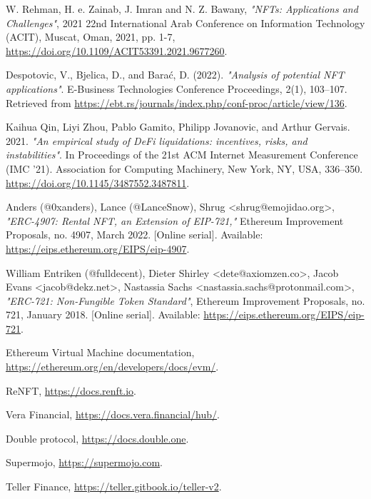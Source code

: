 \documentclass[english, LaM, oneside]{sapthesis}%
\begin{document}
\backmatter
{}
\begin{thebibliography}{17}

W. Rehman, H. e. Zainab, J. Imran and N. Z. Bawany, \textit{"NFTs: Applications and Challenges"}, 2021 22nd International Arab Conference on Information Technology (ACIT), Muscat, Oman, 2021, pp. 1-7, \url{https://doi.org/10.1109/ACIT53391.2021.9677260}.

Despotovic, V., Bjelica, D., and Barać, D. (2022). \textit{"Analysis of potential NFT applications"}. E-Business Technologies Conference Proceedings, 2(1), 103–107. Retrieved from \url{https://ebt.rs/journals/index.php/conf-proc/article/view/136}.

Kaihua Qin, Liyi Zhou, Pablo Gamito, Philipp Jovanovic, and Arthur Gervais. 2021. \textit{"An empirical study of DeFi liquidations: incentives, risks, and instabilities"}. In Proceedings of the 21st ACM Internet Measurement Conference (IMC '21). Association for Computing Machinery, New York, NY, USA, 336–350. \url{https://doi.org/10.1145/3487552.3487811}.

Anders (@0xanders), Lance (@LanceSnow), Shrug <shrug@emojidao.org>, \textit{"ERC-4907: Rental NFT, an Extension of EIP-721,"} Ethereum Improvement Proposals, no. 4907, March 2022. [Online serial]. Available: \url{https://eips.ethereum.org/EIPS/eip-4907}.

William Entriken (@fulldecent), Dieter Shirley <dete@axiomzen.co>, Jacob Evans <jacob@dekz.net>, Nastassia Sachs <nastassia.sachs@protonmail.com>, \textit{"ERC-721: Non-Fungible Token Standard"}, Ethereum Improvement Proposals, no. 721, January 2018. [Online serial]. Available: \url{https://eips.ethereum.org/EIPS/eip-721}.

Ethereum Virtual Machine documentation, \url{https://ethereum.org/en/developers/docs/evm/}.

ReNFT, \url{https://docs.renft.io}.

Vera Financial, \url{https://docs.vera.financial/hub/}.

Double protocol, \url{https://docs.double.one}.

Supermojo, \url{https://supermojo.com}.

Teller Finance, \url{https://teller.gitbook.io/teller-v2}.


\end{thebibliography}
\end{document}
